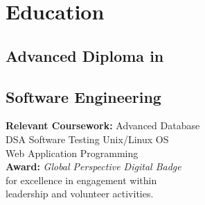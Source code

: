 
\section{Education}

\subsection{Advanced Diploma in}
\subsection{Software Engineering}

{\bf Relevant Coursework:} Advanced Database \\ DSA \textbullet{} Software Testing \textbullet{} Unix/Linux OS \\ Web Application Programming\\
{\bf Award:} \textit{Global Perspective Digital Badge}\\for excellence in engagement within\\leadership and volunteer activities.
